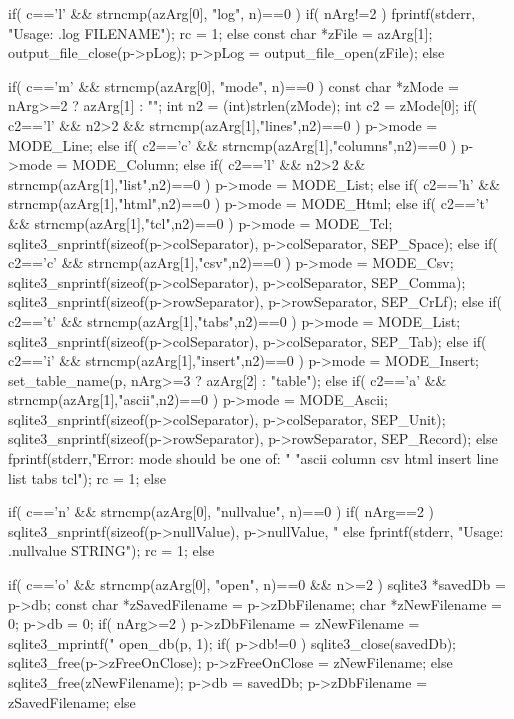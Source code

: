 \begin{Codex}[label=shell.c,numbers=left]
{  if( c=='l' && strncmp(azArg[0], "log", n)==0 ){
    if( nArg!=2 ){
      fprintf(stderr, "Usage: .log FILENAME\n");
      rc = 1;
    }else{
      const char *zFile = azArg[1];
      output_file_close(p->pLog);
      p->pLog = output_file_open(zFile);
    }
  }else

  if( c=='m' && strncmp(azArg[0], "mode", n)==0 ){
    const char *zMode = nArg>=2 ? azArg[1] : "";
    int n2 = (int)strlen(zMode);
    int c2 = zMode[0];
    if( c2=='l' && n2>2 && strncmp(azArg[1],"lines",n2)==0 ){
      p->mode = MODE_Line;
    }else if( c2=='c' && strncmp(azArg[1],"columns",n2)==0 ){
      p->mode = MODE_Column;
    }else if( c2=='l' && n2>2 && strncmp(azArg[1],"list",n2)==0 ){
      p->mode = MODE_List;
    }else if( c2=='h' && strncmp(azArg[1],"html",n2)==0 ){
      p->mode = MODE_Html;
    }else if( c2=='t' && strncmp(azArg[1],"tcl",n2)==0 ){
      p->mode = MODE_Tcl;
      sqlite3_snprintf(sizeof(p->colSeparator), p->colSeparator, SEP_Space);
    }else if( c2=='c' && strncmp(azArg[1],"csv",n2)==0 ){
      p->mode = MODE_Csv;
      sqlite3_snprintf(sizeof(p->colSeparator), p->colSeparator, SEP_Comma);
      sqlite3_snprintf(sizeof(p->rowSeparator), p->rowSeparator, SEP_CrLf);
    }else if( c2=='t' && strncmp(azArg[1],"tabs",n2)==0 ){
      p->mode = MODE_List;
      sqlite3_snprintf(sizeof(p->colSeparator), p->colSeparator, SEP_Tab);
    }else if( c2=='i' && strncmp(azArg[1],"insert",n2)==0 ){
      p->mode = MODE_Insert;
      set_table_name(p, nArg>=3 ? azArg[2] : "table");
    }else if( c2=='a' && strncmp(azArg[1],"ascii",n2)==0 ){
      p->mode = MODE_Ascii;
      sqlite3_snprintf(sizeof(p->colSeparator), p->colSeparator, SEP_Unit);
      sqlite3_snprintf(sizeof(p->rowSeparator), p->rowSeparator, SEP_Record);
    }else {
      fprintf(stderr,"Error: mode should be one of: "
         "ascii column csv html insert line list tabs tcl\n");
      rc = 1;
    }
  }else

  if( c=='n' && strncmp(azArg[0], "nullvalue", n)==0 ){
    if( nArg==2 ){
      sqlite3_snprintf(sizeof(p->nullValue), p->nullValue,
                       "%
    }else{
      fprintf(stderr, "Usage: .nullvalue STRING\n");
      rc = 1;
    }
  }else

  if( c=='o' && strncmp(azArg[0], "open", n)==0 && n>=2 ){
    sqlite3 *savedDb = p->db;
    const char *zSavedFilename = p->zDbFilename;
    char *zNewFilename = 0;
    p->db = 0;
    if( nArg>=2 ){
      p->zDbFilename = zNewFilename = sqlite3_mprintf("%
    }
    open_db(p, 1);
    if( p->db!=0 ){
      sqlite3_close(savedDb);
      sqlite3_free(p->zFreeOnClose);
      p->zFreeOnClose = zNewFilename;
    }else{
      sqlite3_free(zNewFilename);
      p->db = savedDb;
      p->zDbFilename = zSavedFilename;
    }
  }else

}
\end{Codex}
